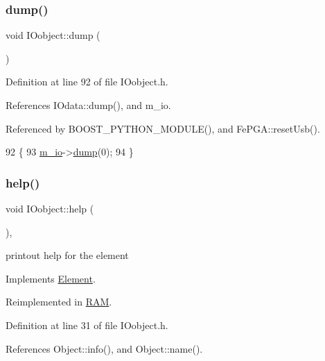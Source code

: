 \subsubsection{\texorpdfstring{dump()}{dump()}}
{\footnotesize\ttfamily void I\+Oobject\+::dump (\begin{DoxyParamCaption}{ }\end{DoxyParamCaption})\hspace{0.3cm}{\ttfamily [inline]}}



Definition at line 92 of file I\+Oobject.\+h.



References I\+Odata\+::dump(), and m\+\_\+io.



Referenced by B\+O\+O\+S\+T\+\_\+\+P\+Y\+T\+H\+O\+N\+\_\+\+M\+O\+D\+U\+L\+E(), and Fe\+P\+G\+A\+::reset\+Usb().


\begin{DoxyCode}
92              \{
93     \hyperlink{classIOobject_aa648e4128c3c37d8291d6bb26b57c504}{m\_io}->\hyperlink{classIOdata_a208e24222bf2044a4ff8bbb1a6bdc13b}{dump}(0);
94   \}
\end{DoxyCode}
\mbox{\label{classIOobject_a0520d82a9773c764fbaede59fe6f8a17}} 
\subsubsection{\texorpdfstring{help()}{help()}}
{\footnotesize\ttfamily void I\+Oobject\+::help (\begin{DoxyParamCaption}{ }\end{DoxyParamCaption})\hspace{0.3cm}{\ttfamily [inline]}, {\ttfamily [virtual]}}

printout help for the element 

Implements \hyperlink{classElement_a32c0de27acb08e17251cef88c3e9303a}{Element}.



Reimplemented in \hyperlink{classRAM_ac1e78007fabee045f00f342a907fa25c}{R\+AM}.



Definition at line 31 of file I\+Oobject.\+h.



References Object\+::info(), and Object\+::name().



